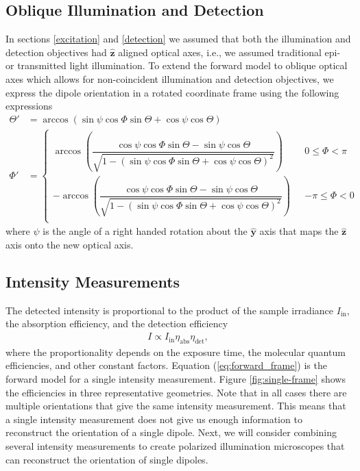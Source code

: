 \documentclass[10pt]{article}
\providecommand{\mh}[1]{\mathbf{\hat{#1}}}
\begin{document}
\subsection{Oblique Illumination and Detection}\label{oblique}
In sections \ref{excitation} and \ref{detection} we assumed that both the
illumination and detection objectives had $\mh{z}$ aligned optical axes, i.e.,
we assumed traditional epi- or transmitted light illumination. To extend the
forward model to oblique optical axes which allows for non-coincident
illumination and detection objectives, we express the dipole orientation in a
rotated coordinate frame using the following expressions
\begin{align}
    \Theta' &= \arccos\left(\sin\psi\cos\Phi\sin\Theta + \cos\psi\cos\Theta\right)\label{eq:thetap}\\
  \Phi' &=
          \begin{cases}
            \arccos\left(\dfrac{\cos\psi\cos\Phi\sin\Theta - \sin\psi\cos\Theta}{\sqrt{1 - (\sin\psi\cos\Phi\sin\Theta + \cos\psi\cos\Theta)^2}}\right) \ \ \ &0 \leq \Phi < \pi  \\
            -\arccos\left(\dfrac{\cos\psi\cos\Phi\sin\Theta - \sin\psi\cos\Theta}{\sqrt{1 - (\sin\psi\cos\Phi\sin\Theta + \cos\psi\cos\Theta)^2}}\right) \ \ \ &-\pi \leq \Phi < 0\\
          \end{cases}\label{eq:phip}
\end{align}
where $\psi$ is the angle of a right handed rotation about the $\mh{y}$ axis
that maps the $\mh{z}$ axis onto the new optical axis.

\subsection{Intensity Measurements}\label{forward}
The detected intensity is proportional to the product of the sample irradiance
$I_{\text{in}}$, the absorption efficiency, and the detection efficiency
\begin{align}
  I \propto I_{\text{in}}\eta_{\text{abs}}\eta_{\text{det}}\label{eq:forward_frame},
\end{align}
where the proportionality depends on the exposure time, the molecular quantum
efficiencies, and other constant factors. Equation (\ref{eq:forward_frame}) is the
forward model for a single intensity measurement. Figure \ref{fig:single-frame}
shows the efficiencies in three representative geometries. Note that in all
cases there are multiple orientations that give the same intensity
measurement. This means that a single intensity measurement does not give us
enough information to reconstruct the orientation of a single dipole. Next, we
will consider combining several intensity measurements to create polarized
illumination microscopes that can reconstruct the orientation of single
dipoles.
\end{document}
